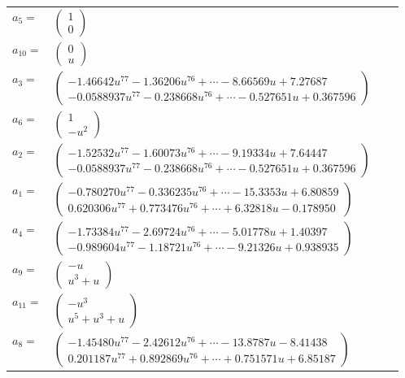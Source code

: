 \documentclass[1p]{elsarticle_modified}
\theoremstyle{definition}
\begin{document}
\begin{tabular}{m{7pt} m{180pt} m{7pt} m{180pt} }
\flushright $a_{5}=$&$\begin{pmatrix}1\\0\end{pmatrix}$ \\
\flushright $a_{10}=$&$\begin{pmatrix}0\\u\end{pmatrix}$ \\
\flushright $a_{3}=$&$\begin{pmatrix}-1.46642 u^{77}-1.36206 u^{76}+\cdots-8.66569 u+7.27687\\-0.0588937 u^{77}-0.238668 u^{76}+\cdots-0.527651 u+0.367596\end{pmatrix}$ \\
\flushright $a_{6}=$&$\begin{pmatrix}1\\- u^2\end{pmatrix}$ \\
\flushright $a_{2}=$&$\begin{pmatrix}-1.52532 u^{77}-1.60073 u^{76}+\cdots-9.19334 u+7.64447\\-0.0588937 u^{77}-0.238668 u^{76}+\cdots-0.527651 u+0.367596\end{pmatrix}$ \\
\flushright $a_{1}=$&$\begin{pmatrix}-0.780270 u^{77}-0.336235 u^{76}+\cdots-15.3353 u+6.80859\\0.620306 u^{77}+0.773476 u^{76}+\cdots+6.32818 u-0.178950\end{pmatrix}$ \\
\flushright $a_{4}=$&$\begin{pmatrix}-1.73384 u^{77}-2.69724 u^{76}+\cdots-5.01778 u+1.40397\\-0.989604 u^{77}-1.18721 u^{76}+\cdots-9.21326 u+0.938935\end{pmatrix}$ \\
\flushright $a_{9}=$&$\begin{pmatrix}- u\\u^3+u\end{pmatrix}$ \\
\flushright $a_{11}=$&$\begin{pmatrix}- u^3\\u^5+u^3+u\end{pmatrix}$ \\
\flushright $a_{8}=$&$\begin{pmatrix}-1.45480 u^{77}-2.42612 u^{76}+\cdots-13.8787 u-8.41438\\0.201187 u^{77}+0.892869 u^{76}+\cdots+0.751571 u+6.85187\end{pmatrix}$ \\

\end{tabular}
\end{document}
